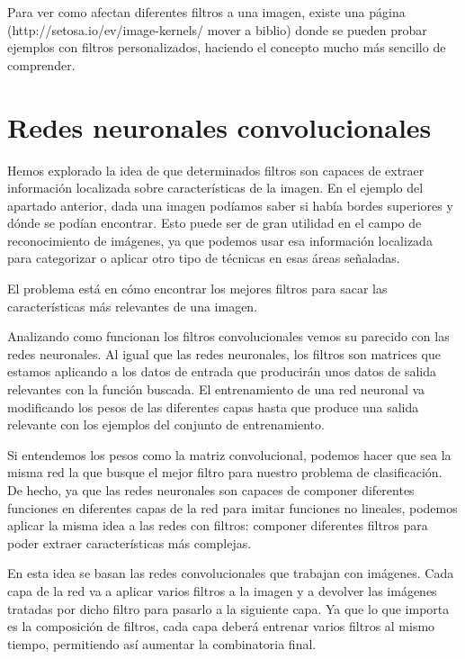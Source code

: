 Para ver como afectan diferentes filtros a una imagen, existe una página (http://setosa.io/ev/image-kernels/ mover a biblio) donde se pueden probar ejemplos con filtros personalizados, haciendo el concepto mucho más sencillo de comprender.

\section{Redes neuronales convolucionales}
\label{sec:conv-net}

Hemos explorado la idea de que determinados filtros son capaces de extraer información localizada sobre características de la imagen. En el ejemplo del apartado anterior, dada una imagen podíamos saber si había bordes superiores y dónde se podían encontrar. Esto puede ser de gran utilidad en el campo de reconocimiento de imágenes, ya que podemos usar esa información localizada para categorizar o aplicar otro tipo de técnicas en esas áreas señaladas.

El problema está en cómo encontrar los mejores filtros para sacar las características más relevantes de una imagen.

Analizando como funcionan los filtros convolucionales vemos su parecido con las redes neuronales. Al igual que las redes neuronales, los filtros son matrices que estamos aplicando a los datos de entrada que producirán unos datos de salida relevantes con la función buscada. El entrenamiento de una red neuronal va modificando los pesos de las diferentes capas hasta que produce una salida relevante con los ejemplos del conjunto de entrenamiento.

Si entendemos los pesos como la matriz convolucional, podemos hacer que sea la misma red la que busque el mejor filtro para nuestro problema de clasificación. De hecho, ya que las redes neuronales son capaces de componer diferentes funciones en diferentes capas de la red para imitar funciones no lineales, podemos aplicar la misma idea a las redes con filtros: componer diferentes filtros para poder extraer características más complejas.

En esta idea se basan las redes convolucionales que trabajan con imágenes. Cada capa de la red va a aplicar varios filtros a la imagen y a devolver las imágenes tratadas por dicho filtro para pasarlo a la siguiente capa. Ya que lo que importa es la composición de filtros, cada capa deberá entrenar varios filtros al mismo tiempo, permitiendo así aumentar la combinatoria final.

\begin{center}
\end{center}

